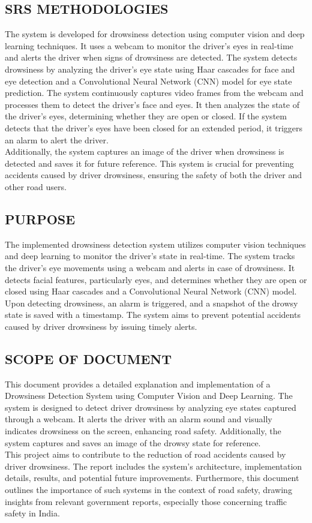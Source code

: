 \documentclass[12pt]{article}
\begin{document}
\subsection{SRS METHODOLOGIES }
The system is developed for drowsiness detection using computer vision and deep learning techniques. It uses a webcam to monitor the driver's eyes in real-time and alerts the driver when signs of drowsiness are detected. The system detects drowsiness by analyzing the driver's eye state using Haar cascades for face and eye detection and a Convolutional Neural Network (CNN) model for eye state prediction. The system continuously captures video frames from the webcam and processes them to detect the driver's face and eyes. It then analyzes the state of the driver's eyes, determining whether they are open or closed. If the system detects that the driver's eyes have been closed for an extended period, it triggers an alarm to alert the driver.\\ Additionally, the system captures an image of the driver when drowsiness is detected and saves it for future reference. This system is crucial for preventing accidents caused by driver drowsiness, ensuring the safety of both the driver and other road users.

\subsection{PURPOSE }
The implemented drowsiness detection system utilizes computer vision techniques and deep learning to monitor the driver's state in real-time. The system tracks the driver's eye movements using a webcam and alerts in case of drowsiness. It detects facial features, particularly eyes, and determines whether they are open or closed using Haar cascades and a Convolutional Neural Network (CNN) model. Upon detecting drowsiness, an alarm is triggered, and a snapshot of the drowsy state is saved with a timestamp. The system aims to prevent potential accidents caused by driver drowsiness by issuing timely alerts.
\subsection{ SCOPE OF DOCUMENT }

This document provides a detailed explanation and implementation of a Drowsiness Detection System using Computer Vision and Deep Learning. The system is designed to detect driver drowsiness by analyzing eye states captured through a webcam. It alerts the driver with an alarm sound and visually indicates drowsiness on the screen, enhancing road safety. Additionally, the system captures and saves an image of the drowsy state for reference. \\ This project aims to contribute to the reduction of road accidents caused by driver drowsiness. The report includes the system's architecture, implementation details, results, and potential future improvements. Furthermore, this document outlines the importance of such systems in the context of road safety, drawing insights from relevant government reports, especially those concerning traffic safety in India.
\end{document}
